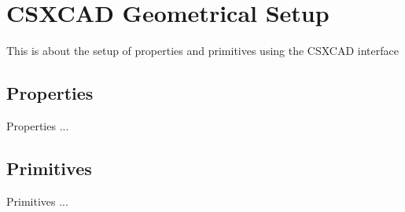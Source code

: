 \chapter{CSXCAD Geometrical Setup}\label{sect-Properties}
	This is about the setup of properties and primitives using the CSXCAD interface

\section{Properties}
Properties ...

\section{Primitives}
Primitives ...

